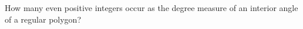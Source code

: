 How many even positive integers occur as the degree measure of an interior angle of a regular polygon?
